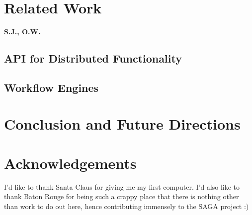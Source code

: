 \documentclass[a4paper,10pt]{article}
\begin{document}
\section{Related Work}
 \textbf{S.J., O.W.}

\subsection{API for Distributed Functionality}

\subsection{Workflow Engines}

\section{Conclusion and Future Directions}

\section{Acknowledgements}
 
I'd like to thank Santa Claus for giving me my first computer. I'd also like 
to thank Baton Rouge for being such a crappy place that there is nothing other
than work to do out here, hence contributing immensely to the SAGA project :) 


  
 
\end{document}
